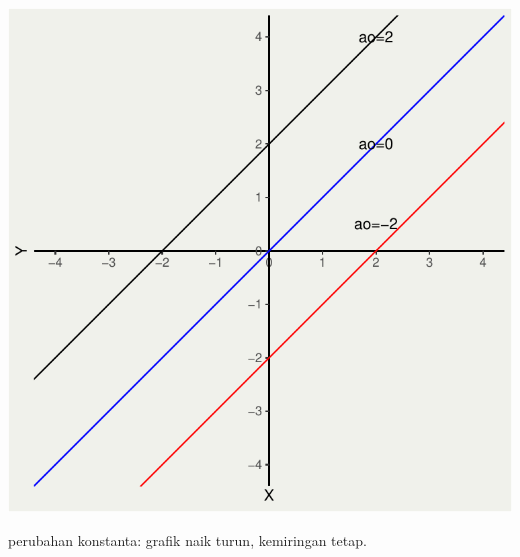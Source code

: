 \documentclass[
  letterpaper,
  DIV=11,
  numbers=noendperiod]{scrartcl}
\begin{document}
\includegraphics{index_files/figure-pdf/unnamed-chunk-6-1.pdf}

perubahan konstanta: grafik naik turun, kemiringan tetap.
\end{document}
